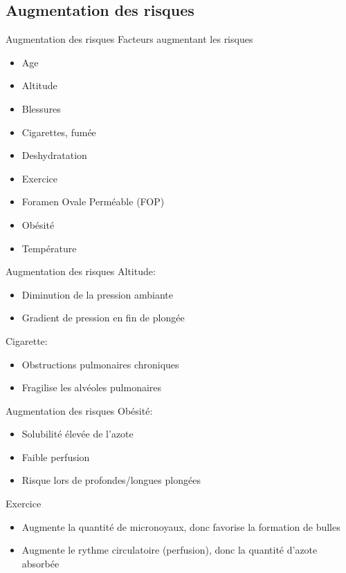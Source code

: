\subsection{Augmentation des risques}
\begin{frame}{Augmentation des risques}
	Facteurs augmentant les risques
	\begin{itemize}
		\item Age
		\item Altitude
		\item Blessures
		\item Cigarettes, fumée
		\item Deshydratation
		\item Exercice
		\item Foramen Ovale Perméable (FOP)
		\item Obésité
		\item Température
	\end{itemize}
\end{frame}

\begin{frame}{Augmentation des risques}  
	Altitude:
	\begin{itemize}
			\item Diminution de la pression ambiante
			\item Gradient de pression en fin de plongée 
		\end{itemize}

	Cigarette:
	\begin{itemize}
		\item Obstructions pulmonaires chroniques
		\item Fragilise les alvéoles pulmonaires
	\end{itemize}
\end{frame}

\begin{frame}{Augmentation des risques}
	Obésité:
	\begin{itemize}
		\item Solubilité élevée de l'azote
		\item Faible perfusion
		\item Risque lors de profondes/longues plongées
	\end{itemize}
	Exercice
	\begin{itemize}
		\item Augmente la quantité de micronoyaux, donc favorise la formation de bulles
		\item Augmente le rythme circulatoire (perfusion), donc la quantité d'azote absorbée
	\end{itemize}
\end{frame}

